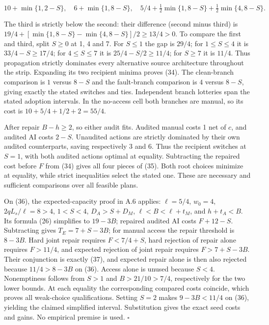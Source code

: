 \documentclass[
  11pt,
  a4paper,
]{article}
\begin{document}
\[10+\min\{1,2-S\},\quad
6+\min\{1,8-S\},\quad
5/4+\tfrac12\min\{1,8-S\}+\tfrac12\min\{4,8-S\}. \tag{42}\]

The third is strictly below the second: their difference (second minus
third) is \(19/4+[\min\{1,8-S\}-\min\{4,8-S\}]/2\geq13/4>0\). To compare
the first and third, split \(S\geq0\) at 1, 4 and 7. For \(S\leq1\) the
gap is \(29/4\); for \(1\leq S\leq4\) it is \(33/4-S\geq17/4\); for
\(4\leq S\leq7\) it is \(25/4-S/2\geq11/4\); for \(S\geq7\) it is
\(11/4\). Thus propagation strictly dominates every alternative source
architecture throughout the strip. Expanding its two recipient minima
proves (34). The clean-branch comparison is \(1\) versus \(8-S\) and the
fault-branch comparison is \(4\) versus \(8-S\), giving exactly the
stated switches and ties. Independent branch lotteries span the stated
adoption intervals. In the no-access cell both branches are manual, so
its cost is \(10+5/4+1/2+2=55/4\).

After repair \(B-h\geq2\), so either audit fits. Audited manual costs 1
net of \(c\), and audited AI costs \(2-S\). Unaudited actions are
strictly dominated by their own audited counterparts, saving
respectively 3 and 6. Thus the recipient switches at \(S=1\), with both
audited actions optimal at equality. Subtracting the repaired cost
before \(F\) from (34) gives all four pieces of (35). Both root choices
minimize at equality, while strict inequalities select the stated one.
These are necessary and sufficient comparisons over all feasible plans.

On (36), the expected-capacity proof in A.6 applies: \(\ell=5/4\),
\(w_0=4\), \(2qL_s/\ell=8>4\), \(1<S<4\), \(D_A>S+D_M\),
\(\ell<B<\ell+t_M\), and \(h+t_A<B\). Its formula (26) simplifies to
\(19-3B\); repaired audited AI costs \(F+12-S\). Subtracting gives
\(T_E=7+S-3B\); for manual access the repair threshold is \(8-3B\). Hard
joint repair requires \(F<7/4+S\), hard rejection of repair alone
requires \(F>11/4\), and expected rejection of joint repair requires
\(F>7+S-3B\). Their conjunction is exactly (37), and expected repair
alone is then also rejected because \(11/4>8-3B\) on (36). Access alone
is unused because \(S<4\). Nonemptiness follows from \(S>1\) and
\(B>21/10>7/4\), respectively for the two lower bounds. At each equality
the corresponding compared costs coincide, which proves all weak-choice
qualifications. Setting \(S=2\) makes \(9-3B<11/4\) on (36), yielding
the claimed simplified interval. Substitution gives the exact seed costs
and gains. No empirical premise is used. \(\square\)
\end{document}
